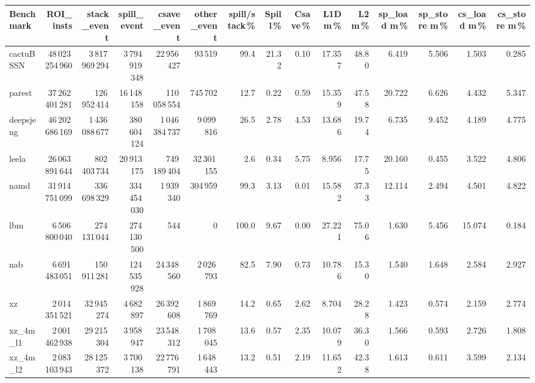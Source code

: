 \documentclass[9pt,landscape,a4paper]{article}
\begin{document}
\vspace{2mm}
\centering
\begin{adjustbox}{max width=\textwidth, max totalheight=0.50\textheight}%
\begin{tabular}{lrrrrrrrrrrrrrr}
\toprule
Benchmark & ROI\_insts & stack\_event & \textbf{spill\_event} & csave\_event & other\_event & spill/stack\,\% & Spill\,\% & Csave\,\% & L1D m\,\% & L2 m\,\% & sp\_load m\,\% & sp\_store m\,\% & cs\_load m\,\% & cs\_store m\,\% \\
\midrule
cactuBSSN & 48\,023\,254\,960 & 3\,817\,969\,294 & 3\,794\,919\,348 & 22\,956\,427 & 93\,519 & 99.4 & 21.32 & 0.10 & 17.357 & 48.80 & 6.419 & 5.506 & 1.503 & 0.285 \\
parest & 37\,262\,401\,281 & 126\,952\,414 & 16\,148\,158 & 110\,058\,554 & 745\,702 & 12.7 & 0.22 & 0.59 & 15.359 & 47.58 & 20.722 & 6.626 & 4.432 & 5.347 \\
deepsjeng & 46\,202\,686\,169 & 1\,436\,088\,677 & 380\,604\,124 & 1\,046\,384\,737 & 9\,099\,816 & 26.5 & 2.78 & 4.53 & 13.686 & 19.74 & 6.735 & 9.452 & 4.189 & 4.775 \\
leela & 26\,063\,891\,644 & 802\,403\,734 & 20\,913\,175 & 749\,189\,404 & 32\,301\,155 & 2.6 & 0.34 & 5.75 & 8.956 & 17.75 & 20.160 & 0.455 & 3.522 & 4.806 \\
namd & 31\,914\,751\,099 & 336\,698\,329 & 334\,454\,030 & 1\,939\,340 & 304\,959 & 99.3 & 3.13 & 0.01 & 15.582 & 37.33 & 12.114 & 2.494 & 4.501 & 4.822 \\
lbm & 6\,506\,800\,040 & 274\,131\,044 & 274\,130\,500 & 544 & 0 & 100.0 & 9.67 & 0.00 & 27.221 & 75.06 & 1.630 & 5.456 & 15.074 & 0.184 \\
nab & 6\,691\,483\,051 & 150\,911\,281 & 124\,535\,928 & 24\,348\,560 & 2\,026\,793 & 82.5 & 7.90 & 0.73 & 10.786 & 15.30 & 1.540 & 1.648 & 2.584 & 2.927 \\
xz & 2\,014\,351\,521 & 32\,945\,274 & 4\,682\,897 & 26\,392\,608 & 1\,869\,769 & 14.2 & 0.65 & 2.62 & 8.704 & 28.28 & 1.423 & 0.574 & 2.159 & 2.774 \\
xz\_4m\_l1 & 2\,001\,462\,938 & 29\,215\,304 & 3\,958\,947 & 23\,548\,312 & 1\,708\,045 & 13.6 & 0.57 & 2.35 & 10.079 & 36.30 & 1.566 & 0.593 & 2.726 & 1.808 \\
xz\_4m\_l2 & 2\,083\,103\,943 & 28\,125\,372 & 3\,700\,138 & 22\,776\,791 & 1\,648\,443 & 13.2 & 0.51 & 2.19 & 11.652 & 42.38 & 1.613 & 0.611 & 3.599 & 2.134 \\

\end{tabular}
\end{adjustbox}
\end{document}
